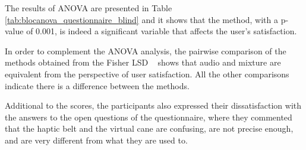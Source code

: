 The results of ANOVA are presented in Table  \ref{tab:blocanova_questionnaire_blind} and it shows that the method, with a p-value of 0.001, is indeed a significant variable that affects the user's satisfaction.



In order to complement the ANOVA analysis, the pairwise comparison of the methods obtained from the Fisher LSD \ %
shows that audio and mixture are equivalent from the perspective of user satisfaction. All the other comparisons indicate there is a difference between the methods.

%

Additional to the scores, the participants also expressed their dissatisfaction with the answers to the open questions of the questionnaire, where they commented that the haptic belt and the virtual cane are confusing, are not precise enough, and are very different from what they are used to.

